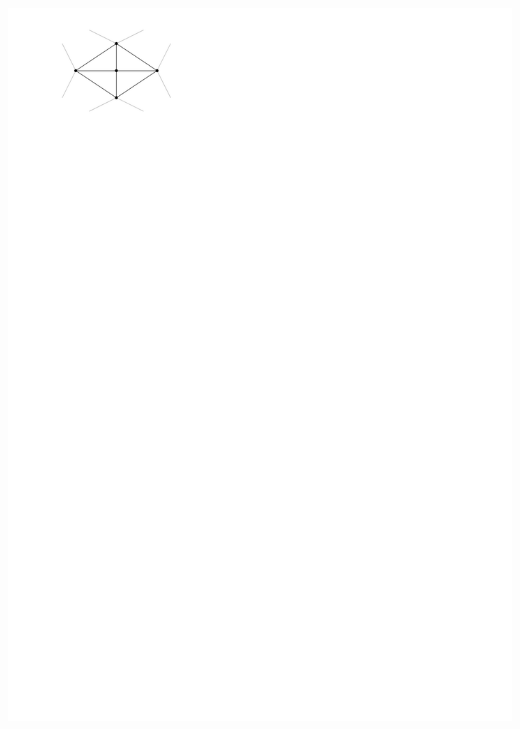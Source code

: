 \documentclass[a4paper]{article}
\begin{document}
\includegraphics[width = \textwidth]{./introduction/img/sep4cycle.pdf}
\clearpage%
\end{document}
